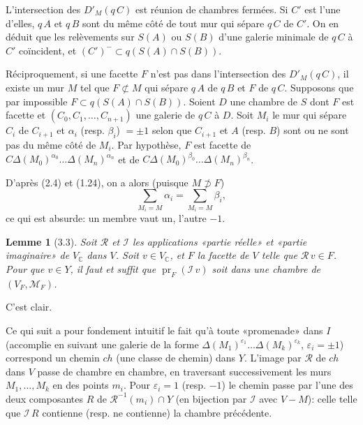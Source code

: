 \documentclass[12pt]{article}
\newtheorem{lemme}[theoreme]{Lemme}
\theoremstyle{remark}
\newcommand{\CC}{\mathbb{C}}
\begin{document}
L'intersection des $D'_M(q \, C)$ est réunion de chambres fermées. Si $C'$ est l'une d'elles, $q \, A$ et $q \, B$ sont du même côté de tout mur qui sépare $q \, C$ de $C'$. On en déduit que les relèvements sur $S(A)$ ou $S(B)$ d'une galerie minimale de $q \, C$ à $C'$ coïncident, et $(C')^- \subset q(S(A) \cap S(B))$.

Réciproquement, si une facette $F$ n'est pas dans l'intersection des $D'_M(q \, C)$, il existe un mur $M$ tel que $F \not\subset M$ qui sépare $q \, A$ de $q \, B$ et $F$ de $q \, C$. Supposons que par impossible $F \subset q(S(A) \cap S(B))$. Soient $D$ une chambre de $S$ dont $F$ est facette et $(C_0, C_1, \ldots, C_{n+1})$ une galerie de $q \, C$ à $D$. Soit $M_i$ le mur qui sépare $C_i$ de $C_{i+1}$ et $\alpha_i$ (resp. $\beta_i$) $= \pm 1$ selon que $C_{i+1}$ et $A$ (resp. $B$) sont ou ne sont pas du même côté de $M_i$. Par hypothèse, $F$ est facette de $C \Delta(M_0)^{\alpha_0} \ldots \Delta(M_n)^{\alpha_n}$ et de $C \Delta(M_0)^{\beta_0} \ldots \Delta(M_n)^{\beta_n}$.

D'après (2.4) et (1.24), on a alors (puisque $M \not\supset F$)
\[\sum_{M_i = M} \alpha_i = \sum_{M_i = M} \beta_i,\]
ce qui est absurde: un membre vaut un, l'autre $-1$.

\begin{lemme}[3.3]
Soit $\mathscr{R}$ et $\mathscr{I}$ les applications «partie réelle» et «partie imaginaire» de $V_\CC$ dans $V$. Soit $v \in V_\CC$, et $F$ la facette de $V$ telle que $\mathscr{R} \, v \in F$. Pour que $v \in Y$, il faut et suffit que $\operatorname{pr}_F(\mathscr{I} \, v)$ soit dans une chambre de $(V_F, \mathcal{M}_F)$.
\end{lemme}

C'est clair.

Ce qui suit a pour fondement intuitif le fait qu'à toute «promenade» dans $I$ (accomplie en suivant une galerie de la forme $\Delta(M_1)^{\varepsilon_1} \ldots \Delta(M_k)^{\varepsilon_k}$, $\varepsilon_i = \pm 1$) correspond un chemin $ch$ (une classe de chemin) dans $Y$. L'image par $\mathscr{R}$ de $ch$ dans $V$ passe de chambre en chambre, en traversant successivement les murs $M_1, \ldots, M_k$ en des points $m_i$. Pour $\varepsilon_i = 1$ (resp. $-1$) le chemin passe par l'une des deux composantes $R$ de $\mathscr{R}^{-1}(m_i) \cap Y$ (en bijection par $\mathscr{I}$ avec $V - M$): celle telle que $\mathscr{I} \, R$ contienne (resp. ne contienne) la chambre précédente.
\end{document}
